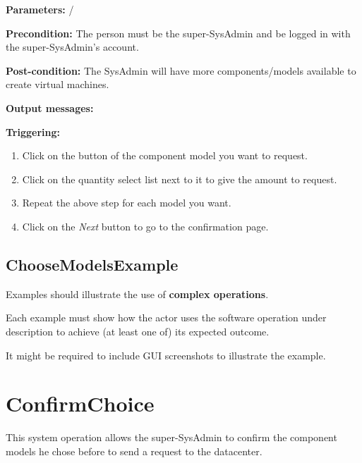 \begin{description}

\item \textbf{Parameters:} /
\item \textbf{Precondition:} The person must be the super-SysAdmin and be logged
in with the super-SysAdmin's account.
\item \textbf{Post-condition:} The SysAdmin will have more components/models
available to create virtual machines.
\item \textbf{Output messages:}

\item \textbf{Triggering:}
\begin{enumerate}
\item Click on the button of the component model you want to request.
\item Click on the quantity select list next to it to give the amount to
request.
\item Repeat the above step for each model you want.
\item Click on the \emph{Next} button to go to the confirmation page.
\end{enumerate}

 
\end{description}

\subsection{ChooseModelsExample}
Examples should illustrate the use of \textbf{complex operations}.

Each example must show how the actor uses the software operation under
description to achieve (at least one of) its expected outcome.

It might be required to include GUI screenshots to illustrate the example.







\section{ConfirmChoice}
\label{operation:confirmchoice}
This system operation allows the super-SysAdmin to confirm the component models
he chose before to send a request to the datacenter.

